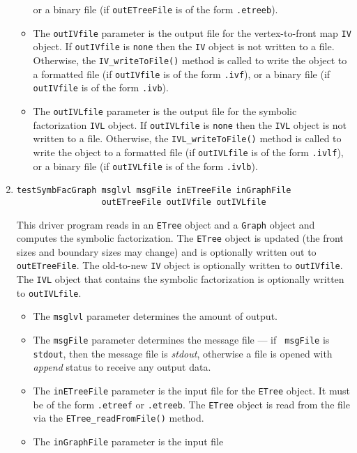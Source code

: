 \begin{enumerate}
\begin{itemize}
or
a binary file (if {\tt outETreeFile} is of the form {\tt *.etreeb}).
\item
The {\tt outIVfile} parameter is the output file for the 
vertex-to-front map {\tt IV} object. 
If {\tt outIVfile} is {\tt none} then the {\tt IV} object is not
written to a file. 
Otherwise, the {\tt IV\_writeToFile()} method is called to write
the object to a formatted file (if {\tt outIVfile} is of the form 
{\tt *.ivf}), or
a binary file (if {\tt outIVfile} is of the form {\tt *.ivb}).
\item
The {\tt outIVLfile} parameter is the output file for the 
symbolic factorization {\tt IVL} object. 
If {\tt outIVLfile} is {\tt none} then the {\tt IVL} object is not
written to a file. 
Otherwise, the {\tt IVL\_writeToFile()} method is called to write
the object to a formatted file (if {\tt outIVLfile} is of the form 
{\tt *.ivlf}), or
a binary file (if {\tt outIVLfile} is of the form {\tt *.ivlb}).
\end{itemize}
\item
\begin{verbatim}
testSymbFacGraph msglvl msgFile inETreeFile inGraphFile
                 outETreeFile outIVfile outIVLfile
\end{verbatim}
This driver program reads in an {\tt ETree} object and a {\tt Graph}
object and computes the symbolic factorization.
The {\tt ETree} object is updated (the front sizes and boundary
sizes may change) and is optionally written out to {\tt outETreeFile}.
The old-to-new {\tt IV} object is optionally written to
{\tt outIVfile}.
The {\tt IVL} object that contains the symbolic factorization is
optionally written to {\tt outIVLfile}.
\par
\begin{itemize}
\item
The {\tt msglvl} parameter determines the amount of output.
\item
The {\tt msgFile} parameter determines the message file --- if {\tt
msgFile} is {\tt stdout}, then the message file is {\it stdout},
otherwise a file is opened with {\it append} status to receive any
output data.
\item
The {\tt inETreeFile} parameter is the input file 
for the {\tt ETree} object. 
It must be of the form {\tt *.etreef} or {\tt *.etreeb}.
The {\tt ETree} object is read from the file via the
{\tt ETree\_readFromFile()} method.
\item
The {\tt inGraphFile} parameter is the input file 

\end{itemize}
\end{enumerate}
